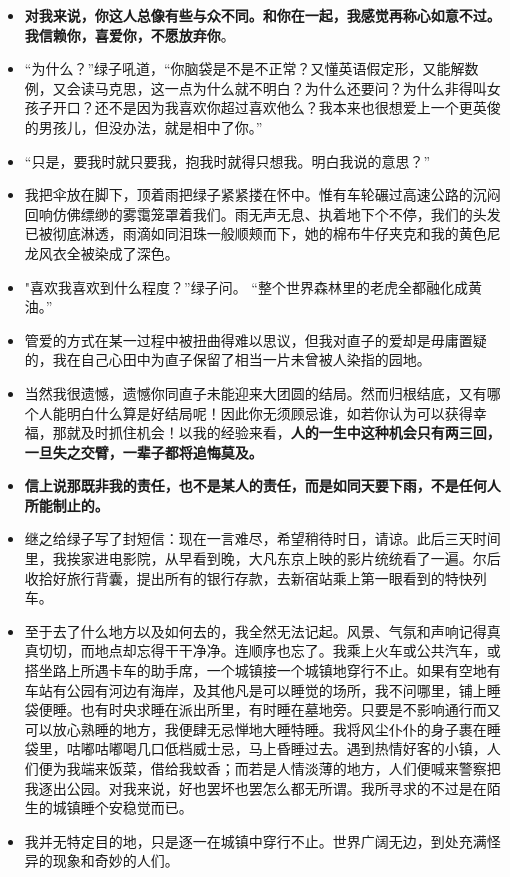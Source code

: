 \documentclass[UTF8,a4paper,8pt]{ctexart}
\begin{document}
\begin{itemize}
 	\item \textbf{对我来说，你这人总像有些与众不同。和你在一起，我感觉再称心如意不过。我信赖你，喜爱你，不愿放弃你}。
 	\item “为什么？”绿子吼道，“你脑袋是不是不正常？又懂英语假定形，又能解数例，又会读马克思，这一点为什么就不明白？为什么还要问？为什么非得叫女孩子开口？还不是因为我喜欢你超过喜欢他么？我本来也很想爱上一个更英俊的男孩儿，但没办法，就是相中了你。”
 	\item “只是，要我时就只要我，抱我时就得只想我。明白我说的意思？”
 	\item 我把伞放在脚下，顶着雨把绿子紧紧搂在怀中。惟有车轮碾过高速公路的沉闷回响仿佛缥缈的雾霭笼罩着我们。雨无声无息、执着地下个不停，我们的头发已被彻底淋透，雨滴如同泪珠一般顺颊而下，她的棉布牛仔夹克和我的黄色尼龙风衣全被染成了深色。
 	\item "喜欢我喜欢到什么程度？”绿子问。 “整个世界森林里的老虎全都融化成黄油。”
 	\item 管爱的方式在某一过程中被扭曲得难以思议，但我对直子的爱却是毋庸置疑的，我在自己心田中为直子保留了相当一片未曾被人染指的园地。
 	\item 当然我很遗憾，遗憾你同直子未能迎来大团圆的结局。然而归根结底，又有哪个人能明白什么算是好结局呢！因此你无须顾忌谁，如若你认为可以获得幸福，那就及时抓住机会！以我的经验来看，\textbf{人的一生中这种机会只有两三回，一旦失之交臂，一辈子都将追悔莫及。}
 	\item \textbf{信上说那既非我的责任，也不是某人的责任，而是如同天要下雨，不是任何人所能制止的。}
 	\item  继之给绿子写了封短信：现在一言难尽，希望稍待时日，请谅。此后三天时间里，我挨家进电影院，从早看到晚，大凡东京上映的影片统统看了一遍。尔后收拾好旅行背囊，提出所有的银行存款，去新宿站乘上第一眼看到的特快列车。
 	\item 至于去了什么地方以及如何去的，我全然无法记起。风景、气氛和声响记得真真切切，而地点却忘得干干净净。连顺序也忘了。我乘上火车或公共汽车，或搭坐路上所遇卡车的助手席，一个城镇接一个城镇地穿行不止。如果有空地有车站有公园有河边有海岸，及其他凡是可以睡觉的场所，我不问哪里，铺上睡袋便睡。也有时央求睡在派出所里，有时睡在墓地旁。只要是不影响通行而又可以放心熟睡的地方，我便肆无忌惮地大睡特睡。我将风尘仆仆的身子裹在睡袋里，咕嘟咕嘟喝几口低档威士忌，马上昏睡过去。遇到热情好客的小镇，人们便为我端来饭菜，借给我蚊香；而若是人情淡薄的地方，人们便喊来警察把我逐出公园。对我来说，好也罢坏也罢怎么都无所谓。我所寻求的不过是在陌生的城镇睡个安稳觉而已。
 	\item 我并无特定目的地，只是逐一在城镇中穿行不止。世界广阔无边，到处充满怪异的现象和奇妙的人们。

\end{itemize}
\end{document}
